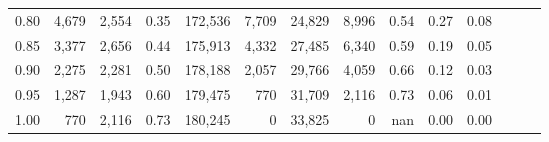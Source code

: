 \begin{tabular}{rrrrrrrrrrrrrr}
0.80 &   4,679 &  2,554 &  0.35 &  172,536 &    7,709 &  24,829 &   8,996 &  0.54 &  0.27 &      0.08 \\
0.85 &   3,377 &  2,656 &  0.44 &  175,913 &    4,332 &  27,485 &   6,340 &  0.59 &  0.19 &      0.05 \\
0.90 &   2,275 &  2,281 &  0.50 &  178,188 &    2,057 &  29,766 &   4,059 &  0.66 &  0.12 &      0.03 \\
0.95 &   1,287 &  1,943 &  0.60 &  179,475 &      770 &  31,709 &   2,116 &  0.73 &  0.06 &      0.01 \\
1.00 &     770 &  2,116 &  0.73 &  180,245 &        0 &  33,825 &       0 &   nan &  0.00 &      0.00 \\
\bottomrule
\end{tabular}
